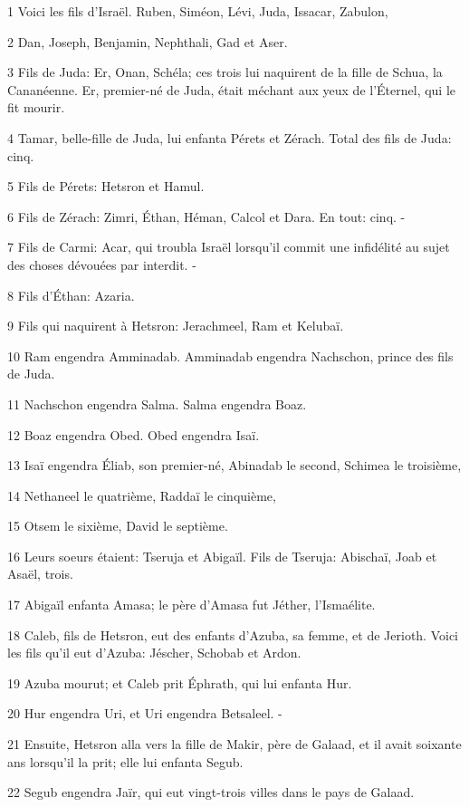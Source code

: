 \par 1 Voici les fils d'Israël. Ruben, Siméon, Lévi, Juda, Issacar, Zabulon,
\par 2 Dan, Joseph, Benjamin, Nephthali, Gad et Aser.
\par 3 Fils de Juda: Er, Onan, Schéla; ces trois lui naquirent de la fille de Schua, la Cananéenne. Er, premier-né de Juda, était méchant aux yeux de l'Éternel, qui le fit mourir.
\par 4 Tamar, belle-fille de Juda, lui enfanta Pérets et Zérach. Total des fils de Juda: cinq.
\par 5 Fils de Pérets: Hetsron et Hamul.
\par 6 Fils de Zérach: Zimri, Éthan, Héman, Calcol et Dara. En tout: cinq. -
\par 7 Fils de Carmi: Acar, qui troubla Israël lorsqu'il commit une infidélité au sujet des choses dévouées par interdit. -
\par 8 Fils d'Éthan: Azaria.
\par 9 Fils qui naquirent à Hetsron: Jerachmeel, Ram et Kelubaï.
\par 10 Ram engendra Amminadab. Amminadab engendra Nachschon, prince des fils de Juda.
\par 11 Nachschon engendra Salma. Salma engendra Boaz.
\par 12 Boaz engendra Obed. Obed engendra Isaï.
\par 13 Isaï engendra Éliab, son premier-né, Abinadab le second, Schimea le troisième,
\par 14 Nethaneel le quatrième, Raddaï le cinquième,
\par 15 Otsem le sixième, David le septième.
\par 16 Leurs soeurs étaient: Tseruja et Abigaïl. Fils de Tseruja: Abischaï, Joab et Asaël, trois.
\par 17 Abigaïl enfanta Amasa; le père d'Amasa fut Jéther, l'Ismaélite.
\par 18 Caleb, fils de Hetsron, eut des enfants d'Azuba, sa femme, et de Jerioth. Voici les fils qu'il eut d'Azuba: Jéscher, Schobab et Ardon.
\par 19 Azuba mourut; et Caleb prit Éphrath, qui lui enfanta Hur.
\par 20 Hur engendra Uri, et Uri engendra Betsaleel. -
\par 21 Ensuite, Hetsron alla vers la fille de Makir, père de Galaad, et il avait soixante ans lorsqu'il la prit; elle lui enfanta Segub.
\par 22 Segub engendra Jaïr, qui eut vingt-trois villes dans le pays de Galaad.
